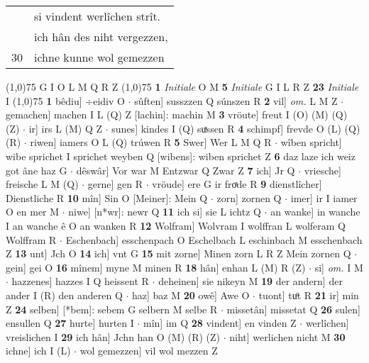 \documentclass[8pt,a4paper,notitlepage]{article}
\begin{document}
\begin{table}[ht]
\begin{minipage}[t]{0.5\linewidth}
\begin{tabular}{rl}
 & si vindent werlîchen strît.\\ 
 & ich hân des niht vergezzen,\\ 
30 & ichne kunne wol gemezzen\\ 
\end{tabular}
\scriptsize
\line(1,0){75} \newline
G I O L M Q R Z \newline
\line(1,0){75} \newline
\textbf{1} \textit{Initiale} O M  \textbf{5} \textit{Initiale} G I L R Z  \textbf{23} \textit{Initiale} I  \newline
\line(1,0){75} \newline
\textbf{1} bêdiu] ÷eidiv O  $\cdot$ sûften] susszzen Q súnszen R \textbf{2} vil] \textit{om.} L M Z  $\cdot$ gemachen] machen I L (Q) Z [lachin]: machin M \textbf{3} vröute] freut I (O) (M) (Q) (Z)  $\cdot$ ir] irs L (M) Q Z  $\cdot$ sunes] kindes I (Q) suͯssen R \textbf{4} schimpf] frevde O (L) (Q) (R)  $\cdot$ riwen] iamers O L (Q) trúwen R \textbf{5} Swer] Wer L M Q R  $\cdot$ wîben spricht] wibe sprichet I sprichet weyben Q [wibens]: wiben sprichet Z \textbf{6} daz laze ich weiz got âne haz G  $\cdot$ dêswâr] Vor war M Entzwar Q Zwar Z \textbf{7} ich] Jr Q  $\cdot$ vriesche] freische L M (Q)  $\cdot$ gerne] gen R  $\cdot$ vröude] ere G ir froͯde R \textbf{9} dienstlîcher] Dienstliche R \textbf{10} mîn] Sin O [Meiner]: Mein Q  $\cdot$ zorn] zornen Q  $\cdot$ imer] ir I iamer O en mer M  $\cdot$ niwe] [n*wr]: newr Q \textbf{11} ich si] sie L ichtz Q  $\cdot$ an wanke] in wanche I an wanche ê O an wanken R \textbf{12} Wolfram] Wolvram I wolffran L wolferam Q Wolffram R  $\cdot$ Eschenbach] esschenpach O Eschelbach L eschinbach M esschenbach Z \textbf{13} unt] Jch O \textbf{14} ich] vnt G \textbf{15} mit zorne] Minen zorn L R Z Mein zornen Q  $\cdot$ gein] gei O \textbf{16} mînem] myne M minen R \textbf{18} hân] enhan L (M) R (Z)  $\cdot$ si] \textit{om.} I M  $\cdot$ hazzenes] hazzes I Q heissent R  $\cdot$ deheinen] sie nikeyn M \textbf{19} der andern] der ander I (R) den anderen Q  $\cdot$ haz] baz M \textbf{20} owê] Awe O  $\cdot$ tuont] tuͦt R \textbf{21} ir] min Z \textbf{24} selben] [*bem]: sebem G selbern M selbe R  $\cdot$ missetân] missetat Q \textbf{26} sulen] ensullen Q \textbf{27} hurte] hurten I  $\cdot$ mîn] im Q \textbf{28} vindent] en vinden Z  $\cdot$ werlîchen] vreislichen I \textbf{29} ich hân] Jchn han O (M) (R) (Z)  $\cdot$ niht] werlichen nicht M \textbf{30} ichne] ich I (L)  $\cdot$ wol gemezzen] vil wol mezzen Z \newline

\end{minipage}
\end{table}
\end{document}
